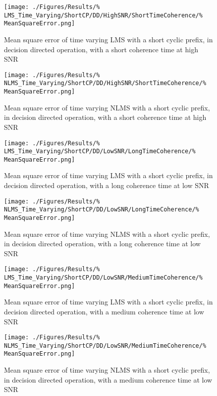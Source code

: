 \begin{figure}[ht]
	\centering
	\begin{minipage}{0.49\textwidth}
		\centering
		\texttt{[image: ./Figures/Results/\%
	LMS\_Time\_Varying/ShortCP/DD/HighSNR/ShortTimeCoherence/\%
	MeanSquareError.png]}
		\captionsetup{width=0.75\linewidth}
		\caption{Mean square error of time varying LMS with a 
		short cyclic prefix, in decision directed operation, 
		with a short coherence time at high SNR}
	\end{minipage}
	\begin{minipage}{0.49\textwidth}
		\centering
		\texttt{[image: ./Figures/Results/\%
	NLMS\_Time\_Varying/ShortCP/DD/HighSNR/ShortTimeCoherence/\%
	MeanSquareError.png]}
		\captionsetup{width=0.75\linewidth}
		\caption{Mean square error of time varying NLMS with 
		a short cyclic prefix, in decision directed 
		operation, with a short coherence time at high SNR}
		\label{fig:NLMS-Short-High-Directed-Short}
	\end{minipage}
\end{figure}

\begin{figure}[ht]
	\centering
	\begin{minipage}{0.49\textwidth}
		\centering
		\texttt{[image: ./Figures/Results/\%
	LMS\_Time\_Varying/ShortCP/DD/LowSNR/LongTimeCoherence/\%
	MeanSquareError.png]}
		\captionsetup{width=0.75\linewidth}
		\caption{Mean square error of time varying LMS with a 
		short cyclic prefix, in decision directed operation, 
		with a long coherence time at low SNR}
	\end{minipage}
	\begin{minipage}{0.49\textwidth}
		\centering
		\texttt{[image: ./Figures/Results/\%
	NLMS\_Time\_Varying/ShortCP/DD/LowSNR/LongTimeCoherence/\%
	MeanSquareError.png]}
		\captionsetup{width=0.75\linewidth}
		\caption{Mean square error of time varying NLMS with 
		a short cyclic prefix, in decision directed 
		operation, with a long coherence time at low SNR}
	\end{minipage}
\end{figure}

\begin{figure}[ht]
	\centering
	\begin{minipage}{0.49\textwidth}
		\centering
		\texttt{[image: ./Figures/Results/\%
	LMS\_Time\_Varying/ShortCP/DD/LowSNR/MediumTimeCoherence/\%
	MeanSquareError.png]}
		\captionsetup{width=0.75\linewidth}
		\caption{Mean square error of time varying LMS with a 
		short cyclic prefix, in decision directed operation, 
		with a medium coherence time at low SNR}
	\end{minipage}
	\begin{minipage}{0.49\textwidth}
		\centering
		\texttt{[image: ./Figures/Results/\%
	NLMS\_Time\_Varying/ShortCP/DD/LowSNR/MediumTimeCoherence/\%
	MeanSquareError.png]}
		\captionsetup{width=0.75\linewidth}
		\caption{Mean square error of time varying NLMS with 
		a short cyclic prefix, in decision directed 
		operation, with a medium coherence time at low SNR}
	\end{minipage}
\end{figure}

